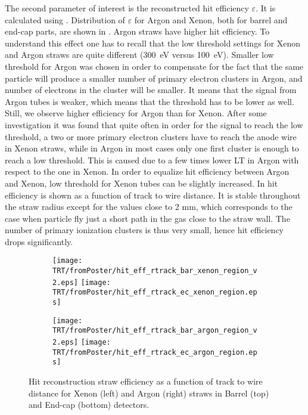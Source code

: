 The second parameter of interest is the reconstructed hit efficiency $\varepsilon$. It is calculated using .
Distribution of $\varepsilon$ for Argon and Xenon, both for barrel and end-cap parts, are shown in .
Argon straws have higher hit efficiency. To understand this effect one has to recall that the low threshold settings
for Xenon and Argon straws are quite different (300~eV versus 100~eV). Smaller low threshold for Argon was chosen 
in order to compensate for the fact that the same particle will produce a smaller number of primary electron clusters in Argon, 
and number of electrons in the cluster will be smaller. It means that the signal from Argon tubes is weaker, which means
that the threshold has to be lower as well. Still, we observe higher efficiency for Argon than for Xenon. After some investigation
it was found that quite often in order for the signal to reach the low threshold, a two or more primary electron clusters have to reach the anode wire in
Xenon straws, while in Argon in most cases only one first cluster is enough to reach a low threshold. This is caused due to a few times lower LT in Argon with respect to the one in Xenon.
In order to equalize hit efficiency between Argon and Xenon, low threshold for Xenon tubes can be slightly increased.
In  hit efficiency is shown as a function of track to wire distance. 
It is stable throughout the straw radius except for the values close to 2 mm, which corresponds
to the case when particle fly just a short path in the gas close to the straw wall. 
The number of primary ionization clusters is thus very small, hence hit efficiency drops significantly.

\begin{figure}

\begin{subfigure}{.5\textwidth}
  \centering
  \texttt{[image: TRT/fromPoster/hit\_eff\_rtrack\_bar\_xenon\_region\_v2.eps]}
  \texttt{[image: TRT/fromPoster/hit\_eff\_rtrack\_ec\_xenon\_region.eps]}
\end{subfigure}%
\begin{subfigure}{.5\textwidth}
  \centering
  \texttt{[image: TRT/fromPoster/hit\_eff\_rtrack\_bar\_argon\_region\_v2.eps]}
  \texttt{[image: TRT/fromPoster/hit\_eff\_rtrack\_ec\_argon\_region.eps]}
\end{subfigure}

\caption{Hit reconstruction straw efficiency as a function of track to wire distance 
for Xenon (left) and Argon (right) straws in Barrel (top) and End-cap (bottom) detectors.}
  \label{fig:hit_eff_rtrack_bar}
\end{figure}

